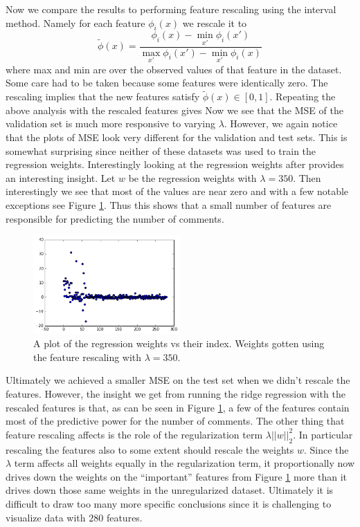 \documentclass{article}
\begin{document}
Now we compare the results to performing feature rescaling using the interval method. Namely for each feature $\phi_i(x)$ we rescale it to 
%
%
%
\begin{equation*}
\tilde{\phi}(x) = \frac{\phi_i(x) - \min_{x'}\phi_i(x')}{\max_{x'}\phi_i(x') - \min_{x'}\phi_i(x)}
\end{equation*}
 where max and min are over the observed values of that feature in the dataset. Some care had to be taken because some features were identically zero. The rescaling implies that the new features satisfy $\tilde{\phi}(x) \in [0,1]$.  Repeating the above analysis with the rescaled features gives
 Now we see that the MSE of the validation set is much more responsive to varying $\lambda$. However, we again notice that the plots of MSE look very different for the validation and test sets. This is somewhat surprising since neither of these datasets was used to train the regression weights. Interestingly looking at the regression weights after provides an interesting insight. Let $w$ be the regression weights with $\lambda = 350$. Then interestingly we see that most of the values are near zero and with a few notable exceptions see Figure \ref{reg-weights-lam-350-normalize-true}. Thus this shows that a small number of features are responsible for predicting the number of comments.
%
 \begin{figure}[h]
\centering
\includegraphics[width=0.5\textwidth]{reg-weights-lam-350-normalize-true}
\caption{A plot of the regression weights vs their index. Weights gotten using the feature rescaling with $\lambda = 350$. }
\label{reg-weights-lam-350-normalize-true}
\end{figure}
%
%
Ultimately we achieved a smaller MSE on the test set when we didn't rescale the features. However, the insight we get from running the ridge regression with the rescaled features is that, as can be seen in Figure \ref{reg-weights-lam-350-normalize-true}, a few of the features contain most of the predictive power for the number of comments. The other thing that feature rescaling affects is the role of the regularization term $\lambda ||w||_2^2$. In particular rescaling the features also to some extent should rescale the weights $w$. Since the $\lambda$ term affects all weights equally in the regularization term, it proportionally now drives down the weights on the ``important'' features from Figure \ref{reg-weights-lam-350-normalize-true} more than it drives down those same weights in the unregularized dataset. Ultimately it is difficult to draw too many more specific conclusions since it is challenging to visualize data with $280$ features.
\end{document}

